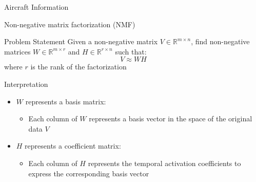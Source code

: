 \documentclass{if-beamer}
\begin{document}
\begin{frame}{Aircraft Information}
\begin{table}[h!]
\centering
{}
\caption{Escape II Data Collection SUAS devices deployed}
\label{table:aircraft}
\end{table}
\end{frame}

\begin{frame}{Non-negative matrix factorization (NMF)}

\begin{block}{Problem Statement}
Given a non-negative matrix $V \in \mathbb{R}^{m \times n}$, find non-negative matrices $W \in \mathbb{R}^{m \times r}$ and $H \in \mathbb{R}^{r \times n}$ such that:
\[ V \approx WH \]
where $r$ is the rank of the factorization
\end{block}

\begin{block}{Interpretation}
\begin{itemize}
\item $W$ represents a basis matrix:
  \begin{itemize}
  \item Each column of $W$ represents a basis vector in the space of the original data $V$
  \end{itemize}
\item $H$ represents a coefficient matrix:
  \begin{itemize}
  \item Each column of $H$ represents the temporal activation coefficients to express the corresponding basis vector
  \end{itemize}
\end{itemize}
\end{block}
\end{frame}
\end{document}
